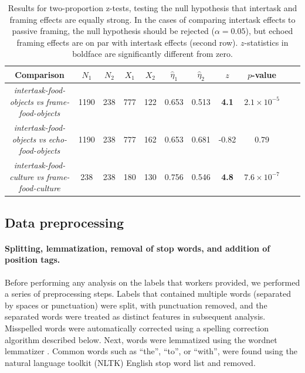 \documentclass{sigchi}
\begin{document}
\begin{table}
\begin{center}
\begin{tabular}{c c c c c c c c c c c }
	\toprule
	Comparison & $N_1$ & $N_2$ & $X_1$ & $X_2$ & $\hat{\eta}_1$ 
		& $\hat{\eta}_2$ & $z$ & $p$-value \\ 
	\midrule
	\parbox[c]{4cm}{\textit{intertask-food-objects} 
	\textit{vs} \textit{frame-food-objects}} & 1190 & 238 & 777 & 122 &
	0.653 & 0.513 & \textbf{4.1} & $2.1 \times 10^{-5}$ \\ 

\noalign{\smallskip}
\hdashline
\noalign{\smallskip}

	\parbox[c]{4cm}{\textit{intertask-food-objects} 
	\textit{vs} \textit{echo-food-objects}} & 1190 & 238 & 777 & 162 
		& 0.653 & 0.681 & -0.82 & 0.79 \\

\noalign{\smallskip}
\hdashline
\noalign{\smallskip}

	\parbox[c]{4cm}{\textit{intertask-food-culture} 
	\textit{vs} \textit{frame-food-culture}} & 238 & 238 & 180 & 130 
	& 0.756 & 0.546 & \textbf{4.8} & $7.6 \times 10^{-7}$ \\
	\bottomrule

\end{tabular}

\caption{
	Results for two-proportion z-tests, testing the null hypothesis that 
	intertask and framing effects are equally strong.
	In the cases of comparing intertask effects to passive framing, the
	null hypothesis should be rejected ($\alpha=0.05$), but 
	echoed framing effects are on par with intertask effects (second row). 
	$z$-statistics in boldface are significantly different from zero.
}
\label{table:intertask_framing}
\end{center}
\end{table}




\subsection*{Data preprocessing}
	\paragraph{Splitting, lemmatization, removal of stop words, and 
		addition of position tags.} 

	Before performing any analysis on the labels that workers provided, we
	performed a series of preprocessing steps.  
	Labels that contained
	multiple words (separated by spaces or punctuation) were split, with
	punctuation removed, and the separated words were treated as distinct 
	features in subsequent analysis.
	Misspelled words were automatically corrected using a spelling 
	correction algorithm described below.  
	Next, words were lemmatized using the
	wordnet lemmatizer \cite{felbaum1998wordnet}.  %
	Common words such as ``the'', ``to'', or ``with'', were found using
	the natural language toolkit (NLTK) English stop word list 
	\cite{loper2002nltk} and removed.
\end{document}
